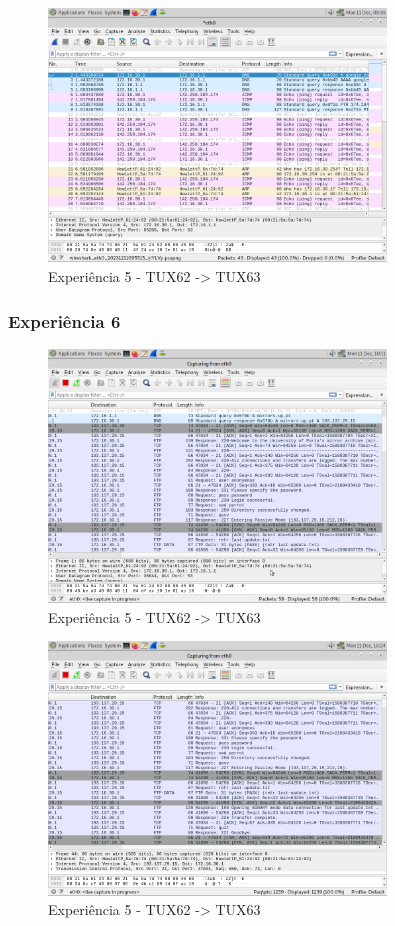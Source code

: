 \documentclass[11pt,a4paper]{article}
\begin{document}
\begin{figure}[H]
    \centering
    \includegraphics[width=0.8\textwidth]{images/experiencia5.png}
    \caption{Experiência 5 - TUX62 -> TUX63}
\end{figure}

\subsubsection{Experiência 6}

\begin{figure}[H]
    \centering
    \includegraphics[width=0.8\textwidth]{images/experiencia6.png}
    \caption{Experiência 5 - TUX62 -> TUX63}
\end{figure}
\begin{figure}[H]
    \centering
    \includegraphics[width=0.8\textwidth]{images/experiencia6-cont.png}
    \caption{Experiência 5 - TUX62 -> TUX63}
\end{figure}
\end{document}
